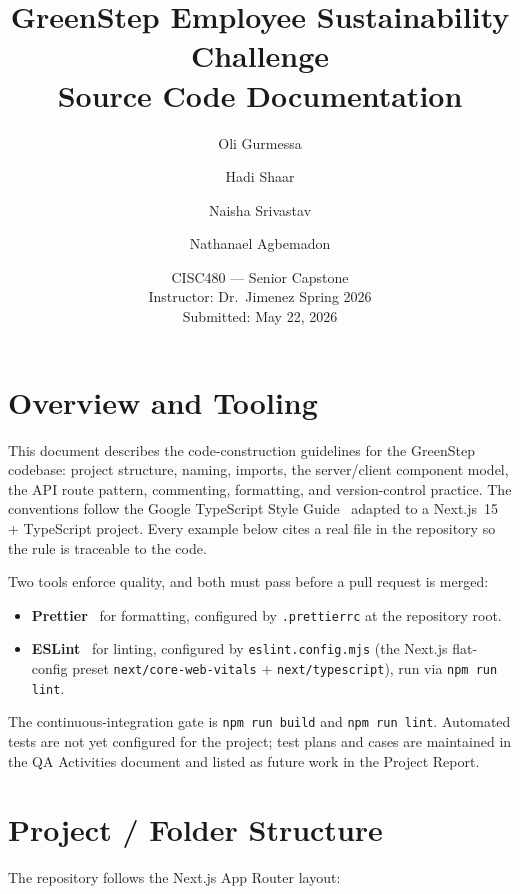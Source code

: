 \documentclass[11pt]{article}
\title{\textbf{GreenStep Employee Sustainability Challenge}\\[0.4em]
\large Source Code Documentation}
\author{Oli Gurmessa \and Hadi Shaar \and Naisha Srivastav \and Nathanael Agbemadon}
\date{CISC480 --- Senior Capstone\\[0.3em]
Instructor: Dr.\ Jimenez \quad\textbullet\quad Spring 2026\\[0.3em]
Submitted: May 22, 2026}
\begin{document}
\maketitle
\tableofcontents
\newpage

\section{Overview and Tooling}

This document describes the code-construction guidelines for the GreenStep
codebase: project structure, naming, imports, the server/client component
model, the API route pattern, commenting, formatting, and version-control
practice. The conventions follow the Google TypeScript Style Guide~\cite{gts}
adapted to a Next.js~15 + TypeScript project. Every example below cites a real
file in the repository so the rule is traceable to the code.

Two tools enforce quality, and both must pass before a pull request is merged:

\begin{itemize}
    \item \textbf{Prettier}~\cite{prettier} for formatting, configured by
    \texttt{.prettierrc} at the repository root.
    \item \textbf{ESLint}~\cite{eslint} for linting, configured by
    \texttt{eslint.config.mjs} (the Next.js flat-config preset
    \texttt{next/core-web-vitals} + \texttt{next/typescript}), run via
    \texttt{npm run lint}.
\end{itemize}

The continuous-integration gate is \texttt{npm run build} and
\texttt{npm run lint}. Automated tests are not yet configured for the project;
test plans and cases are maintained in the QA Activities document and listed
as future work in the Project Report.

\section{Project / Folder Structure}

The repository follows the Next.js App Router layout:
\end{document}

